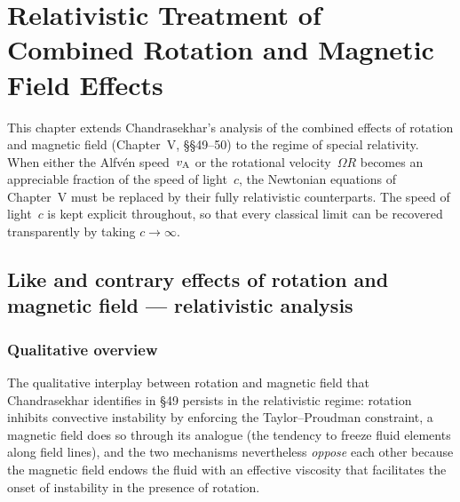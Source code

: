 %

\chapter{Relativistic Treatment of Combined Rotation and Magnetic Field
  Effects}\label{ch:rel-5-49-50}

This chapter extends Chandrasekhar's analysis of the combined effects of
rotation and magnetic field (Chapter~V, \S\S49--50) to the regime of
special relativity.  When either the Alfv\'en speed~$v_{\mathrm{A}}$ or the
rotational velocity~$\Omega R$ becomes an appreciable fraction of the
speed of light~$c$, the Newtonian equations of Chapter~V must be replaced
by their fully relativistic counterparts.  The speed of light~$c$ is kept
explicit throughout, so that every classical limit can be recovered
transparently by taking $c\to\infty$.

\section{Like and contrary effects of rotation and magnetic field ---
  relativistic analysis}\label{sec:rel-49}

\subsection{Qualitative overview}

The qualitative interplay between rotation and magnetic field that
Chandrasekhar identifies in \S49 persists in the relativistic regime:
rotation inhibits convective instability by enforcing the
Taylor--Proudman constraint, a magnetic field does so through its
analogue (the tendency to freeze fluid elements along field lines), and
the two mechanisms nevertheless \emph{oppose} each other because the
magnetic field endows the fluid with an effective viscosity that
facilitates the onset of instability in the presence of rotation.


